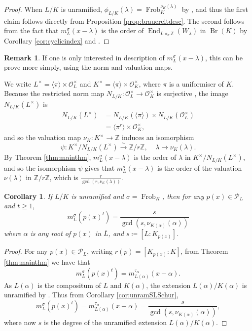 \documentclass[10pt, reqno, hidelinks]{amsart}
\newcommand{\OO}{\mathcal{O}}
\DeclareMathOperator{\Br}{Br}
\DeclareMathOperator{\End}{End}
\DeclareMathOperator{\Frob}{Frob}
\newcommand{\bZ}{{\mathbb Z}}
\newcommand{\sP}{{\mathcal P}}
\numberwithin{thm}{subsection}
\newtheorem{cor}[thm]{Corollary}
\theoremstyle{definition}
\newtheorem{remark}[thm]{Remark}
\begin{document}
\begin{proof}
	When $L / K$ is unramified, $\phi_{L/K}(\lambda) = \Frob_K^{\nu_K(\lambda)}$ by \cite[Lem.\ III.3.7]{milneCFT}, and thus the first claim follows directly from Proposition \ref{prop:brauereltdesc}. The second follows from the fact that $m_L^{\sigma}(x - \lambda)$ is the order of $\End_{L \rtimes_{\sigma} \bZ}(W_{\lambda})$ in $\Br(K)$ by Corollary \ref{cor:cyclicindex} and \cite[Rem.\ IV.4.4(b)]{milneCFT}.
\end{proof}

\begin{remark}
If one is only interested in description of $m_L^{\sigma}(x - \lambda)$, this can be prove more simply, using the norm and valuation maps.

We write $L^\times  = \langle \pi \rangle \times \OO_L^\times$ and $K^\times  = \langle \pi \rangle \times \OO_K^\times$, where $\pi$ is a uniformiser of $K$. Because the restricted norm map $N_{L/K}: \OO_L^\times  \rightarrow \OO_K^\times$ is surjective \cite[Prop.\ III.1.2]{milneCFT}, the image $N_{L/K}(L^\times)$ is
\begin{align*}
    N_{L/K}(L^\times) & = N_{L/K}(\langle \pi \rangle) \times N_{L/K}(\OO_L^\times) \\
    & = \langle \pi^r \rangle \times \OO_K^\times,
\end{align*}
and so the valuation map $\nu_K: K^\times \rightarrow \bZ$ induces an isomorphism
\[
\psi \colon K^{\times} / N_{L/K}(L^{\times}) \xrightarrow{\sim}  \bZ / r \bZ, \ \ \ \ \ \lambda \mapsto \nu_K(\lambda).
\]
By Theorem \ref{thm:mainthm}, $m_L^{\sigma}(x - \lambda)$ is the order of $\lambda $ in  $K^{\times} / N_{L/K}(L^{\times})$, and so the isomorphism $\psi$ gives that $m_L^{\sigma}(x - \lambda)$ is the order of the valuation $\nu(\lambda)$ in $\bZ/r\bZ$, which is $\frac{r}{\gcd(r, \nu_K(\lambda))}$.
\end{remark}

\begin{cor}\label{cor:unramSLSchur2}
    If $L / K$ is unramified and $\sigma = \Frob_K$, then for any $p(x) \in \sP_L$ and $t \geq 1$,
    \[
        m_L^\sigma(p(x)^t) = \frac{s}{\gcd(s, \nu_{K(\alpha)}(\alpha))}
    \]
    where $\alpha$ is any root of $p(x)$ in $\overline{L}$, and $s \coloneqq [L : K_{p(x)}]$.
\end{cor}

\begin{proof}
	For any $p(x) \in \sP_L$, writing $r(p) = [K_{p(x)}:K]$, from Theorem \ref{thm:mainthm} we have that
	\[
    m_L^{\sigma}(p(x)^t) = m_{L(\alpha)}^{\tau_\alpha}(x - \alpha).
    \]
	As $L(\alpha)$ is the compositum of $L$ and $K(\alpha)$, the extension $L(\alpha)/K(\alpha)$ is unramified by \cite[Prop.\ 7.2]{Neu}. Thus from Corollary \ref{cor:unramSLSchur},
	\[
	m_L^{\sigma}(p(x)^t) = m_{L(\alpha)}^{\tau_\alpha}(x - \alpha) = \frac{s}{\gcd(s, \nu_{K(\alpha)}(\alpha))},
	\]
	where now $s$ is the degree of the unramified extension $L(\alpha)/K(\alpha)$.
\end{proof}
\end{document}

